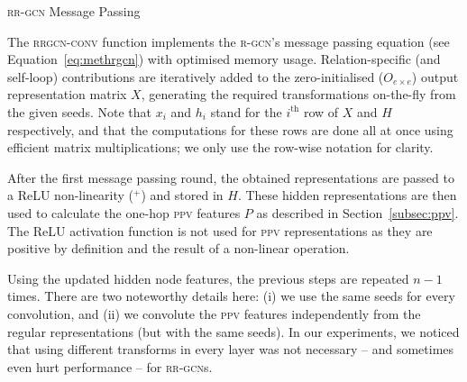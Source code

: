 \documentclass{llncs}
\begin{document}
\begin{algorithm}[h]
\DontPrintSemicolon
{}
  \caption{\textsc{rr-gcn} Message Passing}
  \label{algo:rrgcn-conv}
\end{algorithm}
\setlength{\textfloatsep}{5pt}

The \textsc{rrgcn-conv} function implements the \textsc{r-gcn}'s message passing equation (see Equation~\ref{eq:methrgcn}) with optimised memory usage. Relation-specific (and self-loop) contributions are iteratively added to the zero-initialised ($O_{e \times e}$) output representation matrix $X$, generating the required transformations on-the-fly from the given seeds. Note that $x_i$ and $h_i$ stand for the $i^{\text{th}}$ row of $X$ and $H$ respectively, and that the computations for these rows are done all at once using efficient matrix multiplications; we only use the row-wise notation for clarity.

After the first message passing round, the obtained representations are passed to a ReLU non-linearity ($^+$) and stored in $H$. These hidden representations are then used to calculate the one-hop \textsc{ppv} features $P$ as described in Section~\ref{subsec:ppv}. The ReLU activation function is not used for \textsc{ppv} representations as they are positive by definition and the result of a non-linear operation.

Using the updated hidden node features, the previous steps are repeated $n - 1$ times. There are two noteworthy details here: (i) we use the same seeds for every convolution, and (ii) we convolute the \textsc{ppv} features independently from the regular representations (but with the same seeds). In our experiments, we noticed that using different transforms in every layer was not necessary -- and sometimes even hurt performance -- for \textsc{rr-gcn}s. 
\end{document}
